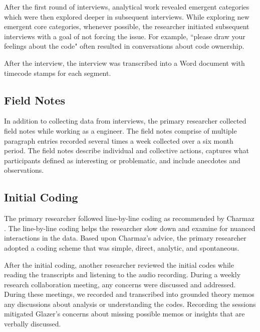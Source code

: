 
After the first round of interviews, analytical work revealed emergent categories which were then explored deeper in subsequent interviews. While exploring new emergent core categories, whenever possible, the researcher initiated subsequent interviews with a goal of not forcing the issue. For example, ``please draw your feelings about the code" often resulted in conversations about code ownership. 

After the interview, the interview was transcribed into a Word document with timecode stamps for each segment.

\subsection{Field Notes}
In addition to collecting data from interviews, the primary researcher collected field notes while working as a engineer. The field notes comprise of multiple paragraph entries recorded several times a week collected over a six month period. The field notes describe individual and collective actions, captures what participants defined as interesting or problematic, and include anecdotes and observations. 
\subsection{Initial Coding}
The primary researcher followed line-by-line coding as recommended by Charmaz \cite{Charmaz}. The line-by-line coding helps the researcher slow down and examine for nuanced interactions in the data. Based upon Charmaz's advice, the primary researcher adopted a coding scheme that was simple, direct, analytic, and spontaneous.  

After the initial coding, another researcher reviewed the initial codes while reading the transcripts and listening to the audio recording. During a weekly research collaboration meeting, any concerns were discussed and addressed. During these meetings, we recorded and transcribed into grounded theory memos any discussions about analysis or understanding the codes. Recording the sessions mitigated Glazer's concerns about missing possible memos or insights that are verbally discussed. \cite{GlaserTheoreticalSensitivity}


